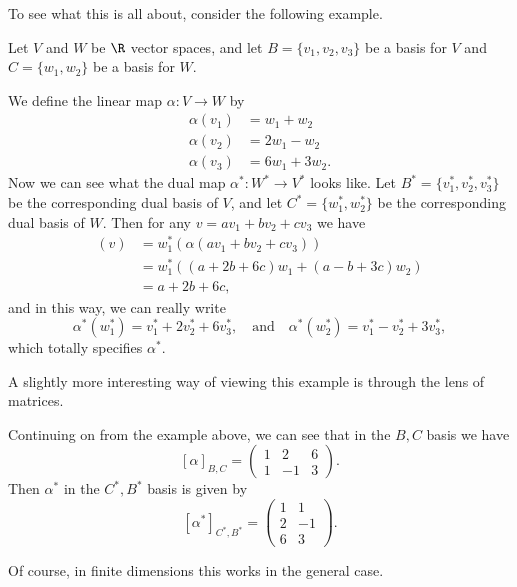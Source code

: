 To see what this is all about, consider the following example.

\begin{example}
Let $V$ and $W$ be $\R$ vector spaces, and let $B = \{v_1, v_2, v_3\}$ be a basis for $V$ and $C = \{w_1, w_2\}$ be a basis for $W$.

We define the linear map $\alpha: V \rightarrow W$ by
\begin{align*}
    \alpha(v_1) &= w_1 + w_2 \\
    \alpha(v_2) &= 2w_1 - w_2 \\
    \alpha(v_3) &= 6w_1 + 3w_2.
\end{align*}
Now we can see what the dual map $\alpha^*: W^* \rightarrow V^*$ looks like. Let $B^* = \{v_1^*, v_2^*, v_3^*\}$ be the corresponding dual basis of $V$, and let $C^* = \{w_1^*, w_2^*\}$ be the corresponding dual basis of $W$. Then for any $v = av_1 + bv_2 + cv_3$ we have
\begin{align*}
    [\alpha^*(w_1^*)](v) &= w_1^*(\alpha(av_1 + bv_2 + cv_3)) \\
    &= w_1^*((a + 2b + 6c)w_1 + (a - b + 3c)w_2)\\
    &= a + 2b + 6c,
\end{align*}
and in this way, we can really write
$$
\alpha^*(w_1^*) = v_1^* +  2v_2^* + 6v_3^*, \quad \text{and} \quad \alpha^*(w_2^*) = v_1^* - v_2^* + 3v_3^*,
$$
which totally specifies $\alpha^*$.
\end{example}

A slightly more interesting way of viewing this example is through the lens of matrices.

\begin{example}
Continuing on from the example above, we can see that in the $B, C$ basis we have
$$
[\alpha]_{B, C} = \begin{pmatrix}
    1 & 2 & 6 \\
    1 & -1 & 3
\end{pmatrix}.
$$
Then $\alpha^*$ in the $C^*, B^*$ basis is given by
$$
[\alpha^*]_{C^*, B^*} = \begin{pmatrix}
    1 & 1 \\ 2 & -1 \\ 6 & 3
\end{pmatrix}.
$$
\end{example}

Of course, in finite dimensions this works in the general case.

